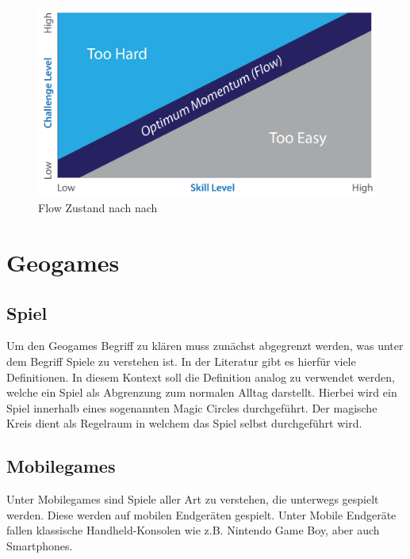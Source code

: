 \begin{figure}[H]
\begin{center}
\includegraphics[width=120mm]{images/ch03_img02_flow.png}
\caption{Flow Zustand nach  nach \cite{Csikszentmihalyi.1991}}
\label{img:ch03_img02_flow}
\end{center}
\end{figure}

\section{Geogames}
\label{ch3:s:Geogames}

\subsection*{Spiel}

Um den Geogames Begriff zu klären muss zunächst abgegrenzt werden, was unter dem Begriff Spiele zu verstehen ist. In der Literatur gibt es hierfür viele Definitionen.
In diesem Kontext soll die Definition analog zu \cite{Salen.2010} verwendet werden, welche ein Spiel als Abgrenzung zum normalen Alltag darstellt. Hierbei wird ein Spiel innerhalb eines sogenannten Magic Circles durchgeführt.
Der magische Kreis dient als Regelraum in welchem das Spiel selbst durchgeführt wird.


\subsection*{Mobilegames}

Unter Mobilegames sind Spiele aller Art zu verstehen, die unterwegs gespielt werden. Diese werden auf mobilen Endgeräten gespielt. \cite{Bell.2006} Unter Mobile Endgeräte fallen klassische Handheld-Konsolen wie z.B. Nintendo Game Boy, aber auch Smartphones.

